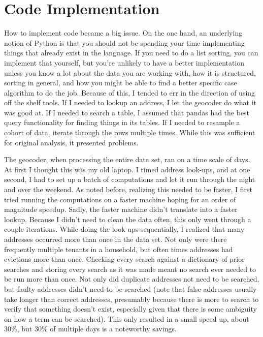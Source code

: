 \chapter{Code Implementation}
\label{chap:codeimplementation}
How to implement code became a big issue.  On the one hand, an underlying notion of Python is that you should not be spending your time implementing things that already exist in the language.  If you need to do a list sorting, you can implement that yourself, but you’re unlikely to have a better implementation unless you know a lot about the data you are working with, how it is structured, sorting in general, and how you might be able to find a better specific case algorithm to do the job.  Because of this, I tended to err in the direction of using off the shelf tools.  If I needed to lookup an address, I let the geocoder do what it was good at.  If I needed to search a table, I assumed that pandas had the best query functionality for finding things in its tables.  If I needed to resample a cohort of data, iterate through the rows multiple times.  While this was sufficient for original analysis, it presented problems.

\par The geocoder, when processing the entire data set, ran on a time scale of days.  At first I thought this was my old laptop.  I timed address look-ups, and at one second, I had to set up a batch of computations and let it run through the night and over the weekend.  As noted before, realizing this needed to be faster, I first tried running the computations on a faster machine hoping for an order of magnitude speedup.  Sadly, the faster machine didn’t translate into a faster lookup.  Because I didn’t need to clean the data often, this only went through a couple iterations.  While doing the look-ups sequentially, I realized that many addresses occurred more than once in the data set.  Not only were there frequently multiple tenants in a household, but often times addresses had evictions more than once.  Checking every search against a dictionary of prior searches and storing every search as it was made meant no search ever needed to be run more than once.  Not only did duplicate addresses not need to be searched, but faulty addresses didn’t need to be searched (note that false addresses usually take longer than correct addresses, presumably because there is more to search to verify that something doesn’t exist, especially given that there is some ambiguity on how a term can be searched).  This only resulted in a small speed up, about 30\%, but 30\% of multiple days is a noteworthy savings.


